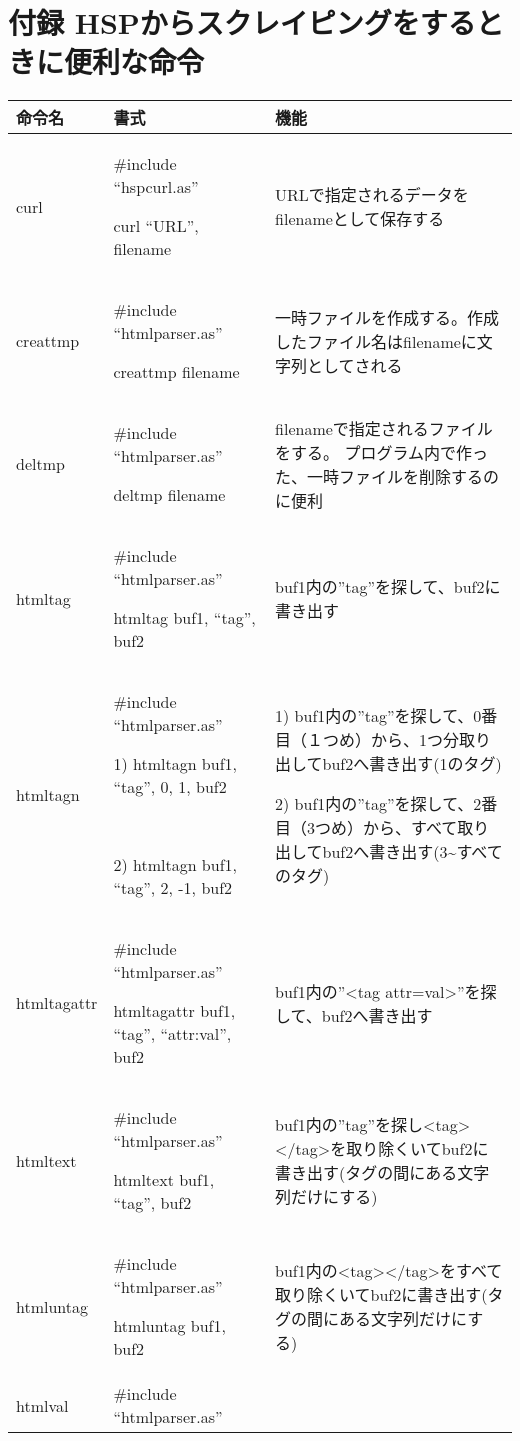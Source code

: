 \clearpage
\section{付録 HSPからスクレイピングをするときに便利な命令}
\begin{center}
\tablefirsthead{}
\tablehead{}
\tabletail{}
\tablelasttail{}
\begin{supertabular}{|m{2.349cm}|m{7.57cm}|m{6.487cm}|}
\hline
命令名 & 書式 & 機能\\\hline
curl &
\#include “hspcurl.as”

curl “URL”, filename &
URLで指定されるデータをfilenameとして保存する\\\hline
creattmp &
\#include “htmlparser.as”

creattmp filename &
一時ファイルを作成する。作成したファイル名はfilenameに文字列としてされる\\\hline
deltmp &
\#include “htmlparser.as”

deltmp filename &
filenameで指定されるファイルをする。
	プログラム内で作った、一時ファイルを削除するのに便利\\\hline
htmltag &
\#include “htmlparser.as”

htmltag buf1, “tag”, buf2 &
buf1内の”tag”を探して、buf2に書き出す\\\hline
htmltagn &
\#include “htmlparser.as”

1) htmltagn buf1, “tag”, 0, 1, buf2

~

2) htmltagn buf1, “tag”, 2, -1, buf2 &
1)
buf1内の”tag”を探して、0番目（１つめ）から、1つ分取り出してbuf2へ書き出す(1のタグ)

2)
buf1内の”tag”を探して、2番目（3つめ）から、すべて取り出してbuf2へ書き出す(3{\textasciitilde}すべてのタグ)\\\hline
htmltagattr &
\#include “htmlparser.as”

htmltagattr buf1, “tag”, “attr:val”, buf2 &
buf1内の”{\textless}tag
attr=val{\textgreater}”を探して、buf2へ書き出す\\\hline
htmltext &
\#include “htmlparser.as”

htmltext buf1, “tag”, buf2 &
buf1内の”tag”を探し{\textless}tag{\textgreater}{\textless}/tag{\textgreater}を取り除くいてbuf2に書き出す(タグの間にある文字列だけにする)\\\hline
htmluntag &
\#include “htmlparser.as”

htmluntag buf1, buf2 &
buf1内の{\textless}tag{\textgreater}{\textless}/tag{\textgreater}をすべて取り除くいてbuf2に書き出す(タグの間にある文字列だけにする)\\\hline
htmlval &
\#include “htmlparser.as”


\end{supertabular}
\end{center}

